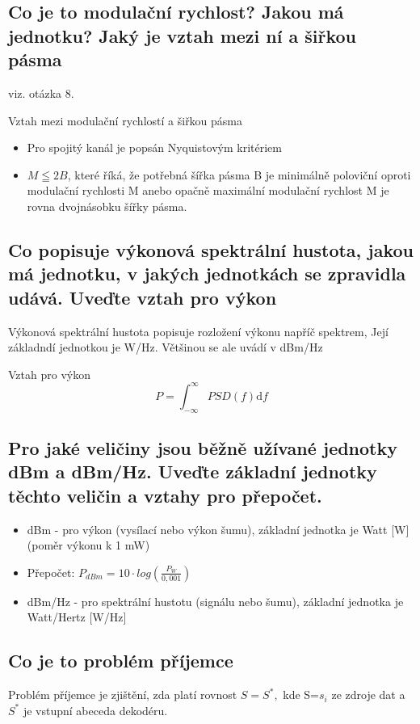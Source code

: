 \subsection{Co je to modulační rychlost? Jakou má jednotku? Jaký je vztah mezi ní a šiřkou pásma}
viz. otázka 8.

Vztah mezi modulační rychlostí a šiřkou pásma
\begin{itemize}
    \item Pro spojitý kanál je popsán Nyquistovým kritériem
    \item $M \leqq 2B $, které říká, že potřebná šířka pásma B je minimálně poloviční oproti modulační rychlosti M anebo opačně maximální modulační rychlost M je rovna dvojnásobku šířky pásma.
\end{itemize}

\subsection{Co popisuje výkonová spektrální hustota, jakou má jednotku, v jakých jednotkách se zpravidla udává. Uveďte vztah pro výkon}
 Výkonová spektrální hustota popisuje rozložení výkonu napříč spektrem, Její základndí jednotkou je W/Hz. Většinou se ale uvádí v dBm/Hz

Vztah pro výkon
$$P = \int_{-\infty}^{\infty} PSD(f)\mathrm{d}f$$

\subsection{Pro jaké veličiny jsou běžně užívané jednotky dBm a dBm/Hz. Uveďte základní jednotky
těchto veličin a vztahy pro přepočet.}
\begin{itemize}
    \item dBm - pro výkon (vysílací nebo výkon šumu), základní jednotka je Watt [W] (poměr výkonu k 1 mW)
    \item Přepočet: $P_{dBm}=10\cdot log\left(\frac{P_W}{0,001}\right)$
    \item dBm/Hz - pro spektrální hustotu (signálu nebo šumu), základní jednotka je Watt/Hertz [W/Hz]
\end{itemize}

\subsection{Co je to problém příjemce}
Problém příjemce je zjištění, zda platí rovnost $S=S^*, $ kde S=${s_i}$ ze zdroje dat a $S^*$ je vstupní abeceda dekodéru.

